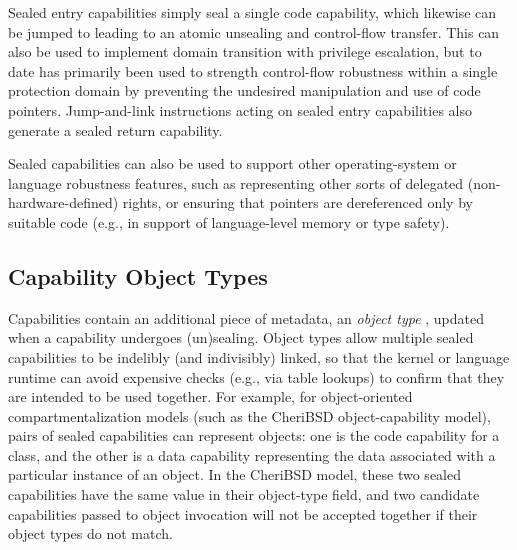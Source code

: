 Sealed entry capabilities simply seal a single code capability, which likewise
can be jumped to leading to an atomic unsealing and control-flow transfer.
This can also be used to implement domain transition with privilege
escalation, but to date has primarily been used to strength control-flow
robustness within a single protection domain by preventing the undesired
manipulation and use of code pointers.
Jump-and-link instructions acting on sealed entry capabilities also generate
a sealed return capability.

Sealed capabilities can also be used to support other operating-system or
language robustness features, such as representing other sorts of delegated
(non-hardware-defined) rights, or ensuring that pointers are dereferenced only
by suitable code (e.g., in support of language-level memory or type safety).


\subsection{Capability Object Types}
\label{sec:model-object-types}

Capabilities contain an additional piece of metadata, an \textit{object
type}%
%
, updated when a capability undergoes (un)sealing.
Object types allow multiple sealed capabilities to be indelibly (and
indivisibly) linked, so that the kernel or language runtime can avoid
expensive checks (e.g., via table lookups) to confirm that they are intended
to be used together.
%
%
For example, for object-oriented compartmentalization models (such as the
CheriBSD object-capability model), pairs of sealed capabilities can represent
objects: one is the code capability for a class, and the other is a data
capability representing the data associated with a particular instance of an
object.
In the CheriBSD model, these two sealed capabilities have the same value in
their object-type field, and two candidate capabilities passed to object
invocation will not be accepted together if their object types do not match.

